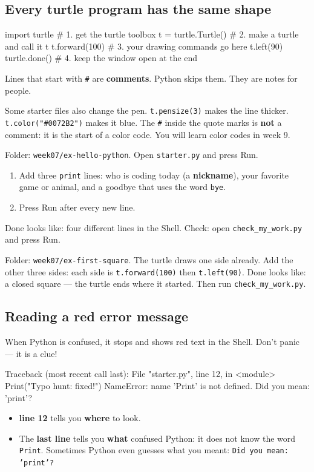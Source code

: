 \subsection{Every turtle program has the same shape}
\begin{pycode}
import turtle            # 1. get the turtle toolbox
t = turtle.Turtle()      # 2. make a turtle and call it t
t.forward(100)           # 3. your drawing commands go here
t.left(90)
turtle.done()            # 4. keep the window open at the end
\end{pycode}
Lines that start with \texttt{\#} are \textbf{comments}. Python skips them. They are notes for people.

Some starter files also change the pen. \texttt{t.pensize(3)} makes the line thicker. \texttt{t.color("\#0072B2")} makes it blue. The \texttt{\#} inside the quote marks is \textbf{not} a comment: it is the start of a color code. You will learn color codes in week 9.

\begin{exercise}
Folder: \texttt{week07/ex-hello-python}. Open \texttt{starter.py} and press Run.
\begin{enumerate}[leftmargin=1.4em,itemsep=1pt]
  \item Add three \texttt{print} lines: who is coding today (a \textbf{nickname}), your favorite game or animal, and a goodbye that uses the word \texttt{bye}.
  \item Press Run after every new line.
\end{enumerate}
Done looks like: four different lines in the Shell. Check: open \texttt{check\_my\_work.py} and press Run.
\end{exercise}

\begin{exercise}
Folder: \texttt{week07/ex-first-square}. The turtle draws one side already. Add the other three sides: each side is \texttt{t.forward(100)} then \texttt{t.left(90)}.
Done looks like: a closed square --- the turtle ends where it started. Then run \texttt{check\_my\_work.py}.
\end{exercise}

\subsection{Reading a red error message}
When Python is confused, it stops and shows red text in the Shell. Don't panic --- it is a clue!
\begin{outputcode}
Traceback (most recent call last):
  File "starter.py", line 12, in <module>
    Print("Typo hunt: fixed!")
NameError: name 'Print' is not defined. Did you mean: 'print'?
\end{outputcode}
\begin{itemize}[leftmargin=1.2em,itemsep=1pt]
  \item \textbf{line 12} tells you \textbf{where} to look.
  \item The \textbf{last line} tells you \textbf{what} confused Python: it does not know the word \texttt{Print}. Sometimes Python even guesses what you meant: \texttt{Did you mean: 'print'?}
\end{itemize}

